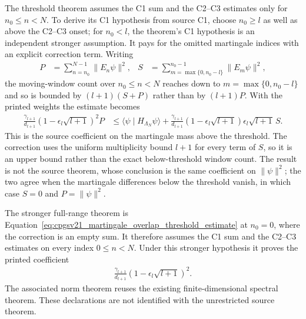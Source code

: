 \documentclass{article}
\begin{document}
The threshold theorem
assumes the C1 sum and the C2--C3 estimates only for $n_0\leq n<N$. To derive
its C1 hypothesis from source C1, choose $n_0\geq l$ as well as above the
C2--C3 onset; for $n_0<l$, the theorem's C1 hypothesis is an independent
stronger assumption. It pays for the omitted martingale indices with an
explicit correction term. Writing
\begin{align}
    P
     & =\sum_{n=n_0}^{N-1}\lVert E_n\psi\rVert^2,
     &
    S
     & =\sum_{m=\max\{0,n_0-l\}}^{n_0-1}\lVert E_m\psi\rVert^2,
    \label{eq:cpgsv21_martingale_overlap_threshold_masses}
\end{align}
the moving-window count over $n_0\leq n<N$ reaches down to
$m=\max\{0,n_0-l\}$ and so is bounded by $(l+1)(S+P)$ rather than by
$(l+1)P$. With the printed weights the estimate becomes
\begin{align}
    \frac{\gamma_{l+1}}{d_{l+1}}
    \left(1-\epsilon_l\sqrt{l+1}\right)^2P
     & \leq
    \langle\psi\mid H_{\Lambda_N}\psi\rangle
    +\frac{\gamma_{l+1}}{d_{l+1}}
    \left(1-\epsilon_l\sqrt{l+1}\right)\epsilon_l\sqrt{l+1}\,S.
    \label{eq:cpgsv21_martingale_overlap_threshold_estimate}
\end{align}
This is the source coefficient on the martingale mass above the threshold. The
correction uses the uniform multiplicity bound $l+1$ for every term of $S$, so
it is an upper bound rather than the exact below-threshold window count. The
result is not the source theorem, whose conclusion is the same coefficient on
$\lVert\psi\rVert^2$; the two agree when the martingale differences below the
threshold vanish, in which case $S=0$ and $P=\lVert\psi\rVert^2$.

The stronger full-range theorem
is Equation~\eqref{eq:cpgsv21_martingale_overlap_threshold_estimate} at
$n_0=0$, where the correction is an empty sum. It therefore assumes the C1
sum and the C2--C3 estimates on every index $0\leq n<N$. Under this stronger
hypothesis it proves the printed coefficient
\begin{align}
    \frac{\gamma_{l+1}}{d_{l+1}}
    \left(1-\epsilon_l\sqrt{l+1}\right)^2.
    \label{eq:cpgsv21_martingale_overlap_nachtergaele_full_range_coefficient}
\end{align}
The associated norm theorem
reuses the existing finite-dimensional spectral theorem. These declarations
are not identified with the unrestricted source theorem.
\end{document}
